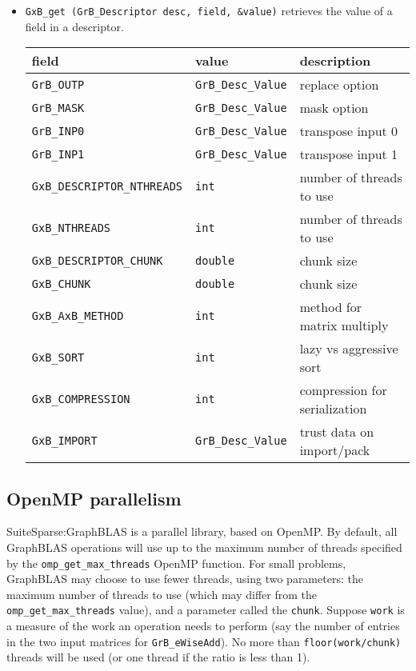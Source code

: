 \documentclass[12pt]{article}
\begin{document}
{\begin{itemize}
\item \verb'GxB_get (GrB_Descriptor desc, field, &value)' retrieves the value
    of a field in a descriptor.

{\footnotesize
\begin{tabular}{lll}
field                       & value         & description \\
\hline
\verb'GrB_OUTP'     & \verb'GrB_Desc_Value' & replace option \\
\verb'GrB_MASK'     & \verb'GrB_Desc_Value' & mask option \\
\verb'GrB_INP0'     & \verb'GrB_Desc_Value' & transpose input 0 \\
\verb'GrB_INP1'     & \verb'GrB_Desc_Value' & transpose input 1 \\
\verb'GxB_DESCRIPTOR_NTHREADS'  & \verb'int' & number of threads to use \\
\verb'GxB_NTHREADS'             & \verb'int' & number of threads to use \\
\verb'GxB_DESCRIPTOR_CHUNK'     & \verb'double' & chunk size \\
\verb'GxB_CHUNK'                & \verb'double' & chunk size \\
\verb'GxB_AxB_METHOD'           & \verb'int' & method for matrix multiply \\
\verb'GxB_SORT'                 & \verb'int' & lazy vs aggressive sort \\
\verb'GxB_COMPRESSION'          & \verb'int' & compression for serialization \\
\verb'GxB_IMPORT'    & \verb'GrB_Desc_Value' & trust data on import/pack \\
\hline
\end{tabular}
}

\end{itemize}

\subsection{OpenMP parallelism}
\label{omp_parallelism}

SuiteSparse:GraphBLAS is a parallel library, based on OpenMP.  By
default, all GraphBLAS operations will use up to the maximum number of threads
specified by the \verb'omp_get_max_threads' OpenMP function.  For small
problems, GraphBLAS may choose to use fewer threads, using two parameters: the
maximum number of threads to use (which may differ from the
\verb'omp_get_max_threads' value), and a parameter called the \verb'chunk'.
Suppose \verb'work' is a measure of the work an operation needs to perform (say
the number of entries in the two input matrices for \verb'GrB_eWiseAdd').  No
more than \verb'floor(work/chunk)' threads will be used (or one thread if the
ratio is less than 1).

}
\end{document}
